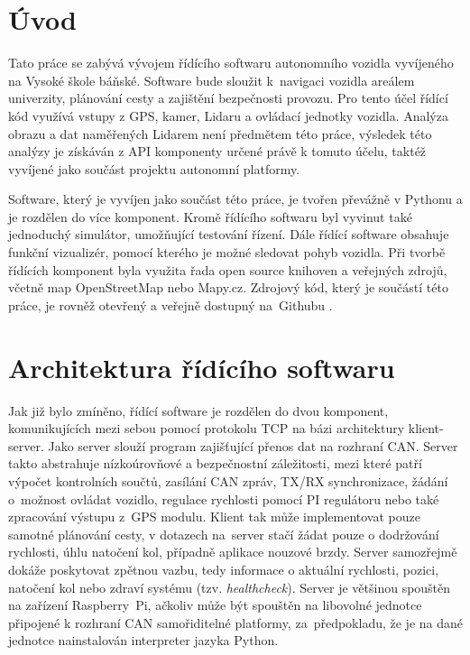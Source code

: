 \documentclass[czech, bachelor]{diploma}
\begin{document}
\MakeTitlePages

\chapter{Úvod} \label{sec:Introduction}
Tato práce se zabývá vývojem řídícího softwaru autonomního vozidla vyvíjeného na Vysoké škole báňské. Software bude sloužit 
k~navigaci vozidla areálem univerzity, plánování cesty a zajištění bezpečnosti provozu. Pro tento účel řídící kód využívá vstupy
z GPS, kamer, Lidaru a ovládací jednotky vozidla. Analýza obrazu a dat naměřených Lidarem není předmětem této práce, výsledek této
analýzy je získáván z API komponenty určené právě k tomuto účelu, taktéž vyvíjené jako součást projektu autonomní platformy.

Software, který je vyvíjen jako součást této práce, je tvořen převážně v Pythonu a je rozdělen do více komponent. Kromě řídícího
softwaru byl vyvinut také jednoduchý simulátor, umožňující testování řízení. Dále řídící software obsahuje funkční vizualizér,
pomocí kterého je možné sledovat pohyb vozidla. Při tvorbě řídících komponent byla využita řada open source knihoven a veřejných
zdrojů, včetně map OpenStreetMap nebo Mapy.cz. Zdrojový kód, který je součástí této práce, je rovněž otevřený a veřejně dostupný
na~Githubu \cite{car-client-source, car-webapp-source, car-map-downloader-source, car-can-source, car-simulator-source,
geologger-source}.

\chapter{Architektura řídícího softwaru} \label{software-architecture}
Jak již bylo zmíněno, řídící software je rozdělen do dvou komponent, komunikujících mezi sebou pomocí protokolu TCP na bázi
architektury klient-server. Jako server slouží program zajišťující přenos dat na rozhraní CAN. Server takto abstrahuje
nízkoúrovňové a bezpečnostní záležitosti, mezi které patří výpočet kontrolních součtů, zasílání CAN zpráv, TX/RX synchronizace,
žádání o~možnost ovládat vozidlo, regulace rychlosti pomocí PI regulátoru nebo také zpracování výstupu z~GPS modulu. Klient tak
může implementovat pouze samotné plánování cesty, v dotazech na~server stačí žádat pouze o dodržování rychlosti, úhlu natočení
kol, případně aplikace nouzové brzdy. Server samozřejmě dokáže poskytovat zpětnou vazbu, tedy informace o aktuální rychlosti,
pozici, natočení kol nebo zdraví systému (tzv. \emph{healthcheck}). Server je většinou spouštěn na zařízení Raspberry~Pi, ačkoliv
může být spouštěn na libovolné jednotce připojené k rozhraní CAN samořiditelné platformy, za~předpokladu, že je na dané jednotce
nainstalován interpreter jazyka Python.
\end{document}
